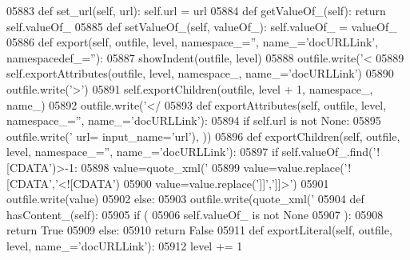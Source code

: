 \begin{DoxyCode}
{{{{{{{{{{{{{{{{{{{{{{{{{{{{{{{{{{{{{{{{{{{{{{{{{{{{{{{{{{{{{{{{{{{{{{{{{{{{{{{{{{{{{{{{{{{{{{{{{{{{{{{{{{{{{{{{{{{{{{{{{{{{{{{{{{{{{{{{{{{{{{{{{{{{{{{{{{{{{{{{{{{{{{{{{{{{{{{{{{{{{{{{{{{{{{{{{{{{{{{{{{{{{{{{{{{{{{{{{{{{{{{{{{{{{{{{{{{{{{{{{{{{{{{{{{{{{{{{{{{{{{{{{{{{{{{{{{{{{{{{{{{{{{{{{{{{{{{{{{{{{{{{{{{{{{{{{{{{{{{{{{{{{{{{{{{{{{{{{{{{{{{{{{{{{{{{{{{{{{{{{05883     \textcolor{keyword}{def }set_url(self, url): self.url = url
05884     \textcolor{keyword}{def }getValueOf_(self): \textcolor{keywordflow}{return} self.valueOf\_
05885     \textcolor{keyword}{def }setValueOf_(self, valueOf\_): self.valueOf\_ = valueOf\_
05886     \textcolor{keyword}{def }export(self, outfile, level, namespace\_='', name\_='docURLLink', namespacedef\_=''):
05887         showIndent(outfile, level)
05888         outfile.write(\textcolor{stringliteral}{'<%
05889         self.exportAttributes(outfile, level, namespace\_, name\_=\textcolor{stringliteral}{'docURLLink'})
05890         outfile.write(\textcolor{stringliteral}{'>'})
05891         self.exportChildren(outfile, level + 1, namespace\_, name\_)
05892         outfile.write(\textcolor{stringliteral}{'</%
05893     \textcolor{keyword}{def }exportAttributes(self, outfile, level, namespace\_='', name\_='docURLLink'):
05894         \textcolor{keywordflow}{if} self.url \textcolor{keywordflow}{is} \textcolor{keywordflow}{not} \textcolor{keywordtype}{None}:
05895             outfile.write(\textcolor{stringliteral}{' url=%
      input\_name=\textcolor{stringliteral}{'url'}), ))
05896     \textcolor{keyword}{def }exportChildren(self, outfile, level, namespace\_='', name\_='docURLLink'):
05897         \textcolor{keywordflow}{if} self.valueOf\_.find(\textcolor{stringliteral}{'![CDATA'})>-1:
05898             value=quote_xml(\textcolor{stringliteral}{'%
05899             value=value.replace(\textcolor{stringliteral}{'![CDATA'},\textcolor{stringliteral}{'<![CDATA'})
05900             value=value.replace(\textcolor{stringliteral}{']]'},\textcolor{stringliteral}{']]>'})
05901             outfile.write(value)
05902         \textcolor{keywordflow}{else}:
05903             outfile.write(quote_xml(\textcolor{stringliteral}{'%
05904     \textcolor{keyword}{def }hasContent_(self):
05905         \textcolor{keywordflow}{if} (
05906             self.valueOf_ \textcolor{keywordflow}{is} \textcolor{keywordflow}{not} \textcolor{keywordtype}{None}
05907             ):
05908             \textcolor{keywordflow}{return} \textcolor{keyword}{True}
05909         \textcolor{keywordflow}{else}:
05910             \textcolor{keywordflow}{return} \textcolor{keyword}{False}
05911     \textcolor{keyword}{def }exportLiteral(self, outfile, level, name\_='docURLLink'):
05912         level += 1
}}}}}}}}}}}}}}}}}}}}}}}}}}}}}}}}}}}}}}}}}}}}}}}}}}}}}}}}}}}}}}}}}}}}}}}}}}}}}}}}}}}}}}}}}}}}}}}}}}}}}}}}}}}}}}}}}}}}}}}}}}}}}}}}}}}}}}}}}}}}}}}}}}}}}}}}}}}}}}}}}}}}}}}}}}}}}}}}}}}}}}}}}}}}}}}}}}}}}}}}}}}}}}}}}}}}}}}}}}}}}}}}}}}}}}}}}}}}}}}}}}}}}}}}}}}}}}}}}}}}}}}}}}}}}}}}}}}}}}}}}}}}}}}}}}}}}}}}}}}}}}}}}}}}}}}}}}}}}}}}}}}}}}}}}}}}}}}}}}}}}}}}}}}}}}}}}}}}}}}}}}}}}}
\end{DoxyCode}
